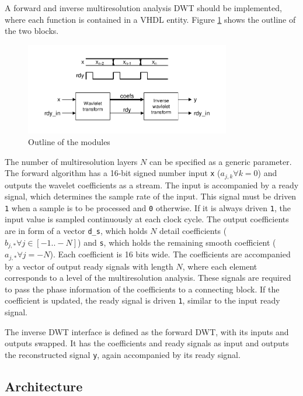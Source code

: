 \begin{refsection}
A forward and inverse multiresolution analysis DWT should be implemented, where each function is contained in a VHDL entity.
Figure \ref{fpga:fig:idea} shows the outline of the two blocks.
\begin{figure}
	\centering
	\includegraphics[width=0.8\textwidth]{papers/fpga/images/idea.pdf}
	\caption{Outline of the modules \label{fpga:fig:idea}}
\end{figure}
The number of multiresolution layers $N$ can be specified as a generic parameter.
The forward algorithm has a 16-bit signed number input \texttt{x} ($a_{j,k} \forall k=0$) and outputs the wavelet coefficients as a stream.
The input is accompanied by a ready signal, which determines the sample rate of the input.
This signal must be driven \texttt{1} when a sample is to be processed and \texttt{0} otherwise.
If it is always driven \texttt{1}, the input value is sampled continuously at each clock cycle.
The output coefficients are in form of a vector \texttt{d\_s}, which holds $N$ detail coefficients ($b_{j,*} \forall j \in [-1 .. -N]$) and \texttt{s}, which holds the remaining smooth coefficient ($a_{j,*} \forall j = -N$).
Each coefficient is 16 bits wide.
The coefficients are accompanied by a vector of output ready signals with length $N$, where each element corresponds to a level of the multiresolution analysis.
These signals are required to pass the phase information of the coefficients to a connecting block.
If the coefficient is updated, the ready signal is driven \texttt{1}, similar to the input ready signal.

The inverse DWT interface is defined as the forward DWT, with its inputs and outputs swapped.
It has the coefficients and ready signals as input and outputs the reconstructed signal \texttt{y}, again accompanied by its ready signal.

\subsection{Architecture}


\end{refsection}
